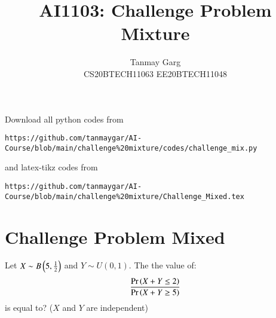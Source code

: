 \documentclass[journal,12pt,twocolumn]{IEEEtran}
\begin{document}
     \def\rightbox#1{\makebox[0in][r]{#1}}
     \def\centbox#1{\makebox[0in]{#1}}
     \def\topbox#1{\raisebox{-\baselineskip}[0in][0in]{#1}}
     \def\midbox#1{\raisebox{-0.5\baselineskip}[0in][0in]{#1}}
\vspace{3cm}
\title{AI1103: Challenge Problem Mixture}
\author{Tanmay Garg \\CS20BTECH11063 EE20BTECH11048}
\maketitle
\newpage
\bigskip
\renewcommand{\thefigure}{\theenumi}
\renewcommand{\thetable}{\theenumi}
%
Download all python codes from 
\begin{lstlisting}
https://github.com/tanmaygar/AI-Course/blob/main/challenge%20mixture/codes/challenge_mix.py
\end{lstlisting}
%
and latex-tikz codes from 
%
\begin{lstlisting}
https://github.com/tanmaygar/AI-Course/blob/main/challenge%20mixture/Challenge_Mixed.tex
\end{lstlisting}
\section*{Challenge Problem Mixed}
Let $X \sim B\left(5,\frac{1}{2}\right)$ and $Y \sim U(0,1)$. The the value of:
\[
    \frac{\Pr\left(X+Y \leq 2\right)}{\Pr\left(X+Y \geq 5\right)}
\]
is equal to? ($X$ and $Y$ are independent)
\end{document}
